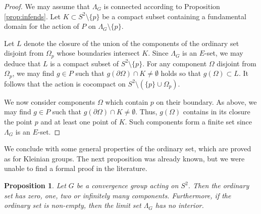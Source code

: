 \documentclass[11pt]{article}
\newtheorem{proposition}[theorem]{Proposition}
\theoremstyle{definition}
\begin{document}
\begin{proof} We may assume that  $\Lambda_G$ is connected according to Proposition \ref{prop:infends}.
Let $K\subset S^2\setminus\{p\}$ be a compact subset containing a fundamental domain for the action
of $P$ on $\Lambda_G\setminus\{p\}$. 
 

Let $L$ denote the closure of the union of the components of the ordinary set disjoint from $\Omega_p$ whose boundaries intersect $K$.
Since $\Lambda_G$ is an $E$-set, we may deduce that $L$ is a compact subset of $S^2\setminus\{p\}$. 
{For} any component $\Omega$ disjoint from $\Omega_p$, we may find
$g\in P$ such that $g(\partial\Omega)\cap K\ne \emptyset$ {holds so that $g(\Omega)\subset L$}. It follows that the action is cocompact on 
$S^2\setminus(\{p\}\cup\Omega_p)$.

We now consider components $\Omega$ which contain $p$ on their boundary. As above, we may find
$g\in P$ such that $g(\partial\Omega)\cap K\ne \emptyset$. Thus, $g(\Omega)$ contains in its closure
the point $p$ and at least one point of $K$. Such components form a finite set since $\Lambda_G$ is an $E$-set.
\end{proof}

We conclude with some general properties of the ordinary set, which are proved as for Kleinian groups. The next proposition
was already known, but we were unable to find a formal proof in the literature. 

\begin{proposition}\label{prop:ordcomp} Let $G$ be a convergence group acting on $S^2$. Then the ordinary set has zero, one, two or infinitely many
components. Furthermore, if the ordinary set is non-empty, then the limit set $\Lambda_G $ has no interior.
\end{proposition}
\end{document}
